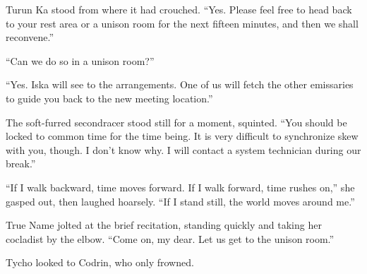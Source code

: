 Turun Ka stood from where it had crouched. ``Yes. Please feel free to head back to your rest area or a unison room for the next fifteen minutes, and then we shall reconvene.''

``Can we do so in a unison room?''

``Yes. Iska will see to the arrangements. One of us will fetch the other emissaries to guide you back to the new meeting location.''

The soft-furred secondracer stood still for a moment, squinted. ``You should be locked to common time for the time being. It is very difficult to synchronize skew with you, though. I don't know why. I will contact a system technician during our break.''

``If I walk backward, time moves forward. If I walk forward, time rushes on,'' she gasped out, then laughed hoarsely. ``If I stand still, the world moves around me.''

True Name jolted at the brief recitation, standing quickly and taking her cocladist by the elbow. ``Come on, my dear. Let us get to the unison room.''

Tycho looked to Codrin, who only frowned.
